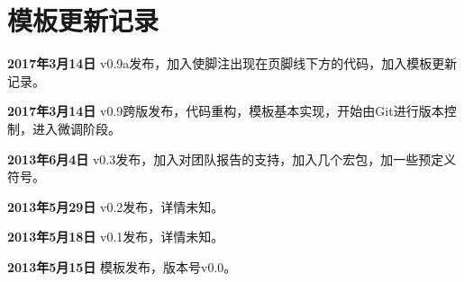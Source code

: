 \chapter{模板更新记录}
\label{chap:updatelog}

\textbf{\songbd 2017年3月14日} v0.9a发布，加入使脚注出现在页脚线下方的代码，加入模板更新记录。

\textbf{\songbd 2017年3月14日} v0.9跨版发布，代码重构，模板基本实现，开始由Git进行版本控制，进入微调阶段。

\textbf{\songbd 2013年6月4日} v0.3发布，加入对团队报告的支持，加入几个宏包，加一些预定义符号。

\textbf{\songbd 2013年5月29日} v0.2发布，详情未知。

\textbf{\songbd 2013年5月18日} v0.1发布，详情未知。

\textbf{\songbd 2013年5月15日} 模板发布，版本号v0.0。
